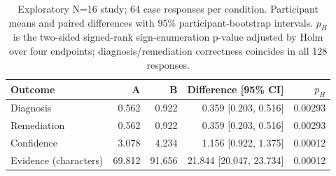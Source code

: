 \begin{table}[t]
\centering
\small
\caption{Exploratory N=16 study; 64 case responses per condition. Participant means and paired differences with 95\% participant-bootstrap intervals. $p_H$ is the two-sided signed-rank sign-enumeration p-value adjusted by Holm over four endpoints; diagnosis/remediation correctness coincides in all 128 responses.}
\label{tab:human-study-summary}
\begin{tabular}{lrrrr}
\toprule
Outcome & A & B & Difference [95\% CI] & $p_H$ \\
\midrule
Diagnosis & 0.562 & 0.922 & 0.359 [0.203, 0.516] & 0.00293 \\
Remediation & 0.562 & 0.922 & 0.359 [0.203, 0.516] & 0.00293 \\
Confidence & 3.078 & 4.234 & 1.156 [0.922, 1.375] & 0.00012 \\
Evidence (characters) & 69.812 & 91.656 & 21.844 [20.047, 23.734] & 0.00012 \\
\bottomrule
\end{tabular}
\end{table}
